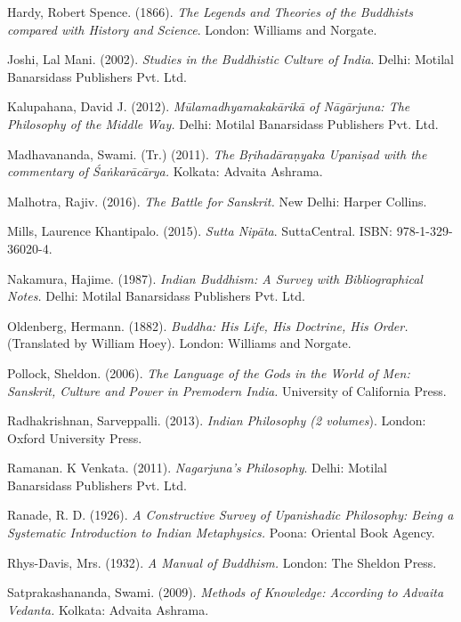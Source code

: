 \begin{thebibliography}{99}
  Hardy, Robert Spence. (1866). \textit{The Legends and Theories of the Buddhists compared with History and Science}. London: Williams and Norgate.

  Joshi, Lal Mani. (2002). \textit{Studies in the Buddhistic Culture of India}. Delhi: Motilal Banarsidass Publishers Pvt. Ltd.

  Kalupahana, David J. (2012). \textit{Mūlamadhyamakakārikā of Nāgārjuna: The Philosophy of the Middle Way.} Delhi: Motilal Banarsidass Publishers Pvt. Ltd.

  Madhavananda, Swami. (Tr.) (2011).  \textit{The Bṛihadāraṇyaka Upaniṣad with the commentary of Śaṅkarācārya.} Kolkata: Advaita Ashrama.

  Malhotra, Rajiv. (2016). \textit{The Battle for Sanskrit.} New Delhi: Harper Collins.

  Mills, Laurence Khantipalo. (2015). \textit{Sutta Nipāta}. SuttaCentral. ISBN: 978-1-329-36020-4.

  Nakamura, Hajime. (1987).\textit{ Indian Buddhism: A Survey with Bibliographical Notes.} Delhi: Motilal Banarsidass Publishers Pvt. Ltd.

  Oldenberg, Hermann. (1882). \textit{Buddha: His Life, His Doctrine, His Order.} (Translated by William Hoey). London: Williams and Norgate.

  Pollock, Sheldon. (2006).\textit{ The Language of the Gods in the World of Men: Sanskrit, Culture and Power in Premodern India.} University of California Press.

  Radhakrishnan, Sarveppalli. (2013). \textit{Indian Philosophy (2 volumes}). London: Oxford University Press.

  Ramanan. K Venkata. (2011). \textit{Nagarjuna’s Philosophy}. Delhi: Motilal Banarsidass Publishers Pvt. Ltd.

  Ranade, R. D. (1926). \textit{A Constructive Survey of Upanishadic Philosophy: Being a Systematic Introduction to Indian Metaphysics.} Poona: Oriental Book Agency.

  Rhys-Davis, Mrs. (1932). \textit{A Manual of Buddhism.} London: The Sheldon Press.

  Satprakashananda, Swami. (2009). \textit{Methods of Knowledge: According to Advaita Vedanta.} Kolkata: Advaita Ashrama.


\end{thebibliography}
